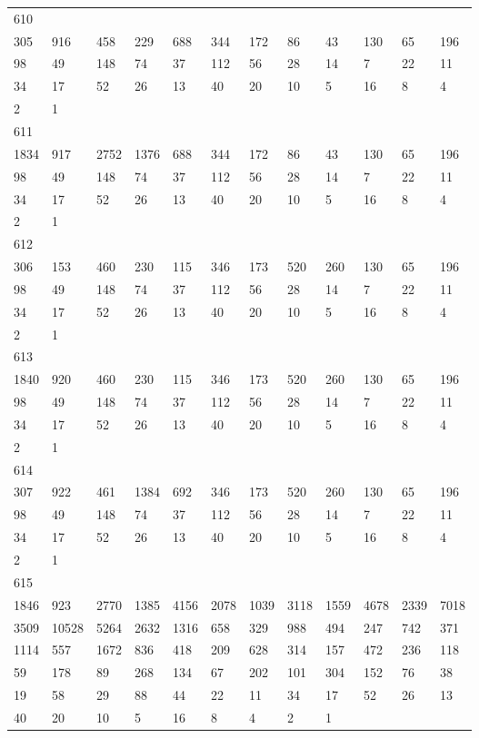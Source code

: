 \begin{longtable}{llllllllllll}
610&&&&&&&&&&&\\
305& 916& 458& 229& 688& 344& 172& 86& 43& 130& 65& 196\\
98& 49& 148& 74& 37& 112& 56& 28& 14& 7& 22& 11\\
34& 17& 52& 26& 13& 40& 20& 10& 5& 16& 8& 4\\
2& 1& \\

611&&&&&&&&&&&\\
1834& 917& 2752& 1376& 688& 344& 172& 86& 43& 130& 65& 196\\
98& 49& 148& 74& 37& 112& 56& 28& 14& 7& 22& 11\\
34& 17& 52& 26& 13& 40& 20& 10& 5& 16& 8& 4\\
2& 1& \\

612&&&&&&&&&&&\\
306& 153& 460& 230& 115& 346& 173& 520& 260& 130& 65& 196\\
98& 49& 148& 74& 37& 112& 56& 28& 14& 7& 22& 11\\
34& 17& 52& 26& 13& 40& 20& 10& 5& 16& 8& 4\\
2& 1& \\

613&&&&&&&&&&&\\
1840& 920& 460& 230& 115& 346& 173& 520& 260& 130& 65& 196\\
98& 49& 148& 74& 37& 112& 56& 28& 14& 7& 22& 11\\
34& 17& 52& 26& 13& 40& 20& 10& 5& 16& 8& 4\\
2& 1& \\

614&&&&&&&&&&&\\
307& 922& 461& 1384& 692& 346& 173& 520& 260& 130& 65& 196\\
98& 49& 148& 74& 37& 112& 56& 28& 14& 7& 22& 11\\
34& 17& 52& 26& 13& 40& 20& 10& 5& 16& 8& 4\\
2& 1& \\

615&&&&&&&&&&&\\
1846& 923& 2770& 1385& 4156& 2078& 1039& 3118& 1559& 4678& 2339& 7018\\
3509& 10528& 5264& 2632& 1316& 658& 329& 988& 494& 247& 742& 371\\
1114& 557& 1672& 836& 418& 209& 628& 314& 157& 472& 236& 118\\
59& 178& 89& 268& 134& 67& 202& 101& 304& 152& 76& 38\\
19& 58& 29& 88& 44& 22& 11& 34& 17& 52& 26& 13\\
40& 20& 10& 5& 16& 8& 4& 2& 1& \\


\end{longtable}
